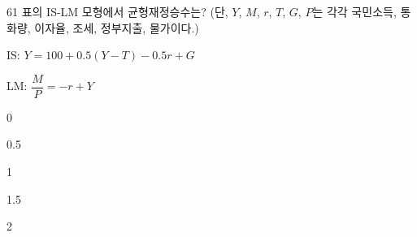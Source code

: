 \begin{question}{61}
표의 IS-LM 모형에서 균형재정승수는? (단, $Y$, $M$, $r$, $T$, $G$, $P$는 각각 국민소득, 통화량, 이자율, 조세, 정부지출, 물가이다.)
\begin{framedtext}
IS: $Y=100+0.5(Y-T)-0.5r+G$ \par
LM: $\dfrac{M}{P}=-r+Y$ \par
\end{framedtext}
\begin{choices}
  \item 0
  \item 0.5
  \item 1
  \item 1.5
  \item 2
\end{choices}
\end{question}
